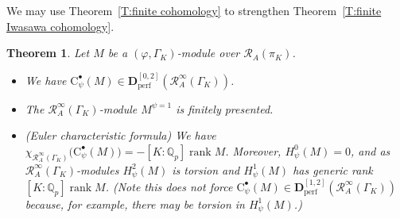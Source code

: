 \documentclass[12pt]{article}
\newtheorem{theorem}{Theorem}[subsection]
\theoremstyle{definition}
\numberwithin{equation}{theorem}
\newcommand{\calR}{\mathcal{R}}
\newcommand{\QQ}{\mathbb{Q}}
\newcommand{\bbD}{\mathbf{D}}
\newcommand{\rmC}{\mathrm{C}}
\newcommand{\perf}{\mathrm{perf}}
\def\Qp{\QQ_p}
\DeclareMathOperator{\rank}{rank}
\begin{document}
We may use Theorem~\ref{T:finite cohomology} to strengthen Theorem~\ref{T:finite Iwasawa cohomology}.

\begin{theorem}
\label{T:strong Iwasawa cohomology}
Let $M$ be a $(\varphi, \Gamma_K)$-module
over $\calR_A(\pi_K)$.  

\begin{itemize}
\item[(1)]  We have $\rmC^\bullet_\psi(M) \in \bbD_\perf^{[0,2]} (\calR_A^\infty(\Gamma_K))$.
\item[(2)] The $\calR_A^\infty(\Gamma_K)$-module $M^{\psi=1}$ is finitely presented.
\item[(3)](Euler characteristic formula) We have
  $\chi_{\calR_A^\infty(\Gamma_K)} \big( \rmC^\bullet_\psi(M)\big) =
  -[K:\Qp]\rank M$.  Moreover, $H_\psi^0(M) = 0$, and as
  $\calR_A^\infty(\Gamma_K)$-modules $H_\psi^2(M)$ is torsion and
  $H_\psi^1(M)$ has generic rank $[K:\Qp]\rank M$.  (Note this does
  not force $\rmC^\bullet_\psi(M) \in
  \bbD_\perf^{[1,2]}(\calR_A^\infty(\Gamma_K))$ because, for example,
  there may be torsion in $H^1_\psi(M)$.)
\end{itemize}

\end{theorem}
\end{document}
